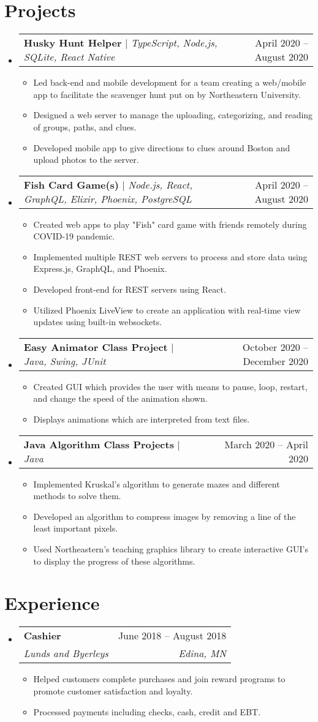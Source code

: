 \documentclass[letterpaper,11pt]{article}
\makeatletter
\newcommand{\resumeItem}[1]{
	\item\small{
		{#1 \vspace{-2pt}}
	}
}
\newcommand{\resumeSubheading}[4]{
	\vspace{-2pt}\item
	\begin{tabular*}{0.97\textwidth}[t]{l@{\extracolsep{\fill}}r}
		\textbf{#1} & #2 \\
		\textit{\small#3} & \textit{\small #4} \\
	\end{tabular*}\vspace{-7pt}
}
\newcommand{\resumeProjectHeading}[2]{
	\item
	\begin{tabular*}{0.97\textwidth}{l@{\extracolsep{\fill}}r}
		\small#1 & #2 \\
	\end{tabular*}\vspace{-7pt}
}
\newcommand{\resumeSubHeadingListStart}{\begin{itemize}[leftmargin=0.15in, label={}]}
\newcommand{\resumeSubHeadingListEnd}{\end{itemize}}
\newcommand{\resumeItemListStart}{\begin{itemize}}
\newcommand{\resumeItemListEnd}{\end{itemize}\vspace{-5pt}}
\makeatother
\begin{document}
\section{Projects}
\resumeSubHeadingListStart
\resumeProjectHeading
{\textbf{Husky Hunt Helper} $|$ \emph{TypeScript, Node,js, SQLite, React Native}}{April 2020 -- August 2020}
\resumeItemListStart
\resumeItem{Led back-end and mobile development for a team creating a web/mobile app to facilitate the scavenger hunt put on by Northeastern University.}
\resumeItem{Designed a web server to manage the uploading, categorizing, and reading of groups, paths, and clues.}
\resumeItem{Developed mobile app to give directions to clues around Boston and upload photos to the server.}
\resumeItemListEnd
\resumeProjectHeading
{\textbf{Fish Card Game(s)} $|$ \emph{Node.js, React, GraphQL, Elixir, Phoenix, PostgreSQL}}{April 2020 -- August 2020}
\resumeItemListStart
\resumeItem{Created web apps to play "Fish" card game with friends remotely during COVID-19 pandemic.}
\resumeItem{Implemented multiple REST web servers to process and store data using Express.js, GraphQL, and Phoenix.}
\resumeItem{Developed front-end for REST servers using React.}
\resumeItem{Utilized Phoenix LiveView to create an application with real-time view updates using built-in websockets.}
\resumeItemListEnd
\resumeProjectHeading
{\textbf{Easy Animator Class Project} $|$
	\emph{Java, Swing, JUnit}}{October 2020 -- December 2020}
\resumeItemListStart
\resumeItem{Created GUI which provides the user with means to pause, loop, restart, and change the speed of the animation shown.}
\resumeItem{Displays animations which are interpreted from text files.}
\resumeItemListEnd
\resumeProjectHeading
{\textbf{Java Algorithm Class Projects} $|$
	\emph{Java}}{March 2020 -- April 2020}
\resumeItemListStart
\resumeItem{Implemented Kruskal's algorithm to generate mazes and different methods to solve them.}
\resumeItem{Developed an algorithm to compress images by removing a line of the least important pixels.}
\resumeItem{Used Northeastern's teaching graphics library to create interactive GUI's to display the progress of these algorithms.}
\resumeItemListEnd
\resumeSubHeadingListEnd

\section{Experience}
\resumeSubHeadingListStart
\resumeSubheading
{Cashier}{June 2018 -- August 2018}
{Lunds and Byerleys}{Edina, MN}
\resumeItemListStart
\resumeItem{Helped customers complete purchases and join reward programs to promote customer satisfaction and loyalty.}
\resumeItem{Processed payments including checks, cash, credit and EBT.}
\resumeItemListEnd
\resumeSubHeadingListEnd
\end{document}
